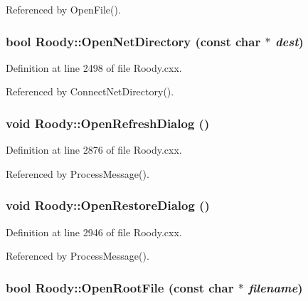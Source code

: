 Referenced by OpenFile().
\subsubsection[{OpenNetDirectory}]{\setlength{\rightskip}{0pt plus 5cm}bool Roody::OpenNetDirectory (const char $\ast$ {\em dest})\hspace{0.3cm}{\ttfamily  [private]}}\label{classRoody_a97bae4a2a71b69ec650b62925b028825}


Definition at line 2498 of file Roody.cxx.

Referenced by ConnectNetDirectory().
\subsubsection[{OpenRefreshDialog}]{\setlength{\rightskip}{0pt plus 5cm}void Roody::OpenRefreshDialog ()\hspace{0.3cm}{\ttfamily  [private]}}\label{classRoody_aa3421e10a9f4a8b7ad20bdda66964ae7}


Definition at line 2876 of file Roody.cxx.

Referenced by ProcessMessage().
\subsubsection[{OpenRestoreDialog}]{\setlength{\rightskip}{0pt plus 5cm}void Roody::OpenRestoreDialog ()\hspace{0.3cm}{\ttfamily  [private]}}\label{classRoody_afe70fea53eba9e5bc30f3b0daa164746}


Definition at line 2946 of file Roody.cxx.

Referenced by ProcessMessage().
\subsubsection[{OpenRootFile}]{\setlength{\rightskip}{0pt plus 5cm}bool Roody::OpenRootFile (const char $\ast$ {\em filename})\hspace{0.3cm}{\ttfamily  [private]}}\label{classRoody_a1e24dd6677e49764770a4a72a33aaa89}


